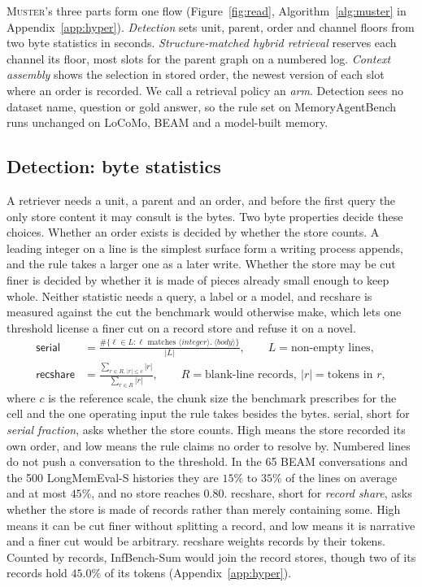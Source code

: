 \documentclass{article}
\newcommand{\sys}{\textsc{Muster}}
\newcommand{\serial}{\textsf{serial}}
\newcommand{\cov}{\textsf{recshare}}
\begin{document}
\sys{}'s three parts form one flow (Figure~\ref{fig:read}, Algorithm~\ref{alg:muster} in Appendix~\ref{app:hyper}). \emph{Detection} sets unit, parent, order and channel floors from two byte statistics in seconds. \emph{Structure-matched hybrid retrieval} reserves each channel its floor, most slots for the parent graph on a numbered log. \emph{Context assembly} shows the selection in stored order, the newest version of each slot where an order is recorded. We call a retrieval policy an \emph{arm}. Detection sees no dataset name, question or gold answer, so the rule set on MemoryAgentBench runs unchanged on LoCoMo, BEAM and a model-built memory.

\subsection{Detection: byte statistics}\label{sec:stats}

A retriever needs a unit, a parent and an order, and before the first query the only store content it may consult is the bytes. Two byte properties decide these choices. Whether an order exists is decided by whether the store counts. A leading integer on a line is the simplest surface form a writing process appends, and the rule takes a larger one as a later write. Whether the store may be cut finer is decided by whether it is made of pieces already small enough to keep whole. Neither statistic needs a query, a label or a model, and \cov{} is measured against the cut the benchmark would otherwise make, which lets one threshold license a finer cut on a record store and refuse it on a novel.
\begin{align}
\serial &= \frac{\#\{\ell \in L : \ell \text{ matches } \langle\textit{integer}\rangle\texttt{.}\ \langle\textit{body}\rangle\}}{|L|},
\qquad L = \text{non-empty lines}, \\
\cov &= \frac{\sum_{r \in R,\, |r| \le c} |r|}{\sum_{r \in R} |r|},
\qquad R = \text{blank-line records},\ |r| = \text{tokens in } r,
\end{align}
where $c$ is the reference scale, the chunk size the benchmark prescribes for the cell and the one operating
input the rule takes besides the bytes.
\serial{}, short for \emph{serial fraction}, asks whether the store counts. High means the store recorded its own order, and low means the rule claims no order to resolve by. Numbered lines do not push a conversation to the threshold. In the 65 BEAM conversations and the 500 LongMemEval-S histories \cite{longmemeval} they are $15\%$ to $35\%$ of the lines on average and at most $45\%$, and no store reaches $0.80$. \cov{}, short for \emph{record share}, asks whether the store is made of
records rather than merely containing some. High means it can be cut finer without
splitting a record, and low means it is narrative and a finer cut would be arbitrary. \cov{} weights records by their tokens. Counted by records, InfBench-Sum would join the record stores, though two of its records hold $45.0\%$ of its tokens (Appendix~\ref{app:hyper}).
\end{document}
